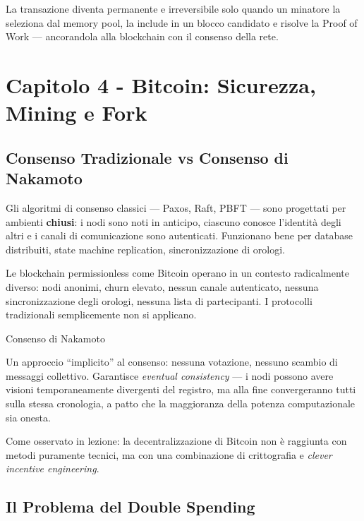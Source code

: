 \documentclass[
  italian,
  openany]{book}
\begin{document}
La transazione diventa permanente e irreversibile solo quando un
minatore la seleziona dal memory pool, la include in un blocco candidato
e risolve la Proof of Work --- ancorandola alla blockchain con il
consenso della rete.

\newpage

\chapter{Capitolo 4 - Bitcoin: Sicurezza, Mining e
Fork}\label{capitolo-4---bitcoin-sicurezza-mining-e-fork}

\section{Consenso Tradizionale vs Consenso di
Nakamoto}\label{consenso-tradizionale-vs-consenso-di-nakamoto}

Gli algoritmi di consenso classici --- Paxos, Raft, PBFT --- sono
progettati per ambienti \textbf{chiusi}: i nodi sono noti in anticipo,
ciascuno conosce l'identità degli altri e i canali di comunicazione sono
autenticati. Funzionano bene per database distribuiti, state machine
replication, sincronizzazione di orologi.

Le blockchain permissionless come Bitcoin operano in un contesto
radicalmente diverso: nodi anonimi, churn elevato, nessun canale
autenticato, nessuna sincronizzazione degli orologi, nessuna lista di
partecipanti. I protocolli tradizionali semplicemente non si applicano.

\begin{calloutdefinition}{Consenso di Nakamoto}

Un approccio ``implicito'' al consenso: nessuna votazione, nessuno
scambio di messaggi collettivo. Garantisce \emph{eventual consistency}
--- i nodi possono avere visioni temporaneamente divergenti del
registro, ma alla fine convergeranno tutti sulla stessa cronologia, a
patto che la maggioranza della potenza computazionale sia onesta.

\end{calloutdefinition}

Come osservato in lezione: la decentralizzazione di Bitcoin non è
raggiunta con metodi puramente tecnici, ma con una combinazione di
crittografia e \emph{clever incentive engineering}.

\section{Il Problema del Double
Spending}\label{il-problema-del-double-spending}
\end{document}

